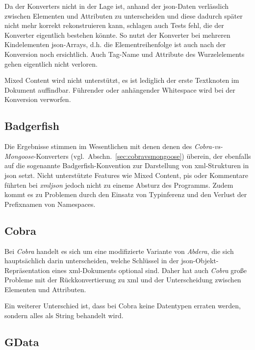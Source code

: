 Da der Konverters nicht in der Lage ist, anhand der \acrshort{json}-Daten verlässlich zwischen Elementen und Attributen zu unterscheiden und diese dadurch später nicht mehr korrekt rekonstruieren kann, schlagen auch Tests fehl, die der Konverter eigentlich bestehen könnte. So nutzt der Konverter bei mehreren Kindelementen \acrshort{json}-Arrays, d.h. die Elementreihenfolge ist auch nach der Konversion noch ersichtlich.
Auch Tag-Name und Attribute des Wurzelelements gehen eigentlich nicht verloren.

Mixed Content wird nicht unterstützt, es ist lediglich der erste Textknoten im Dokument auffindbar.
Führender oder anhängender Whitespace wird bei der Konversion verworfen.

\subsection{Badgerfish}
\label{sec:xmljson-badgerfish}

Die Ergebnisse stimmen im Wesentlichen mit denen  denen des \emph{Cobra-vs-Mongoose}-Konverters (vgl.~Abschn.~\ref{sec:cobravsmongoose}) überein, der ebenfalls auf die sogenannte Badgerfish-Konvention zur Darstellung von \acrshort{xml}-Strukturen in \acrshort{json} setzt. Nicht unterstützte Features wie Mixed Content, \glspl{pi} oder Kommentare führten bei \emph{xmljson} jedoch nicht zu eineme Absturz des Programms. Zudem kommt es zu Problemen durch den Einsatz von Typinferenz und den Verlust der Prefixnamen von Namespaces.

\subsection{Cobra}
\label{sec:xmljson-cobra}

Bei \emph{Cobra} handelt es sich um eine modifizierte Variante von \emph{Abdera}, die sich hauptsächlich darin unterscheiden, welche Schlüssel in der \acrshort{json}-Objekt-Repräsentation eines \acrshort{xml}-Dokuments optional sind. Daher hat auch \emph{Cobra} große Probleme mit der Rückkonvertierung zu \acrshort{xml} und der Unterscheidung zwischen Elementen und Attributen.

Ein weiterer Unterschied ist, dass bei Cobra keine Datentypen erraten werden, sondern alles als String behandelt wird.

\subsection{GData}
\label{sec:xmljson-gdata}

